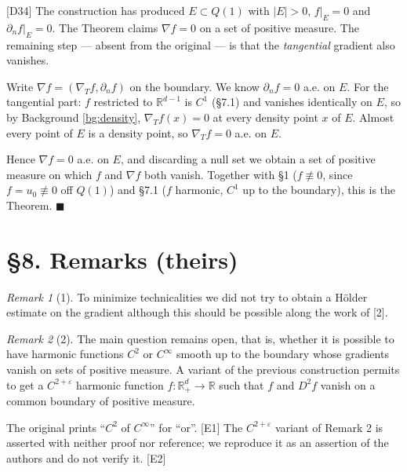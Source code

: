 \documentclass[11pt,reqno]{amsart}
\theoremstyle{plain}
\theoremstyle{definition}
\theoremstyle{plain}
\theoremstyle{definition}
\theoremstyle{remark}
\newtheorem*{rmk}{Remark}
\newcommand{\Rd}{\mathbb{R}^d_+}
\newcommand{\Rdm}{\mathbb{R}^{d-1}}
\newcommand{\nd}{\partial_n}
\newcommand{\Ledger}[1]{{\scriptsize\textsf{[#1]}}}
\begin{document}
\begin{filled}
\Ledger{D34} The construction has produced $E\subset Q(1)$ with $|E|>0$,
$f|_E=0$ and $\nd f|_E=0$. The Theorem claims $\nabla f=0$ on a set of positive
measure. The remaining step --- absent from the original --- is that the
\emph{tangential} gradient also vanishes.

Write $\nabla f=(\nabla_Tf,\nd f)$ on the boundary. We know $\nd f=0$ a.e. on $E$.
For the tangential part: $f$ restricted to $\Rdm$ is $C^1$ (\S7.1) and vanishes
identically on $E$, so by Background \ref{bg:density}, $\nabla_Tf(x)=0$ at every
density point $x$ of $E$. Almost every point of $E$ is a density point, so
$\nabla_Tf=0$ a.e. on $E$.

Hence $\nabla f=0$ a.e. on $E$, and discarding a null set we obtain a set of
positive measure on which $f$ and $\nabla f$ both vanish. Together with \S1
($f\not\equiv0$, since $f=u_0\not\equiv0$ off $Q(1)$) and \S7.1 ($f$ harmonic, $C^1$
up to the boundary), this is the Theorem. \hfill$\blacksquare$
\end{filled}

\section*{\S8. Remarks (theirs)}

\begin{rmk}[1]
To minimize technicalities we did not try to obtain a H\"older estimate on the
gradient although this should be possible along the work of [2].
\end{rmk}

\begin{rmk}[2]
The main question remains open, that is, whether it is possible to have harmonic
functions $C^2$ or $C^\infty$ smooth up to the boundary whose gradients vanish on
sets of positive measure. A variant of the previous construction permits to get a
$C^{2+\varepsilon}$ harmonic function $f:\Rd\to\mathbb R$ such that $f$ and $D^2f$
vanish on a common boundary of positive measure.
\end{rmk}

\begin{ournotation}
The original prints ``$C^2$ of $C^\infty$'' for ``or''. \Ledger{E1} The
$C^{2+\varepsilon}$ variant of Remark 2 is asserted with neither proof nor
reference; we reproduce it as an assertion of the authors and do not verify it.
\Ledger{E2}
\end{ournotation}
\end{document}

